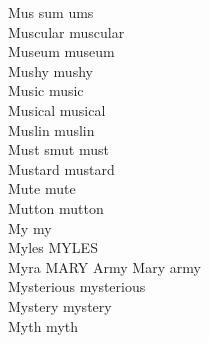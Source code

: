 Mus sum ums\\
Muscular muscular\\
Museum museum\\
Mushy mushy\\
Music music\\
Musical musical\\
Muslin muslin\\
Must smut must\\
Mustard mustard\\
Mute mute\\
Mutton mutton\\
My my\\
Myles MYLES\\
Myra MARY Army Mary army\\
Mysterious mysterious\\
Mystery mystery\\
Myth myth\\

